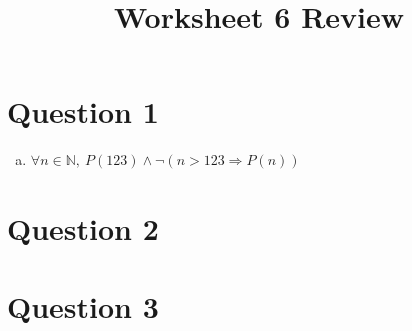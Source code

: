 \documentclass[12pt]{article}
\begin{document}
\title{Worksheet 6 Review}
\maketitle

\section*{Question 1}
\begin{enumerate}[a.]
    \item

    $\forall n \in \mathbb{N},\:P(123) \land \neg (n > 123 \Rightarrow P(n))$
\end{enumerate}

\section*{Question 2}

\section*{Question 3}
\end{document}

